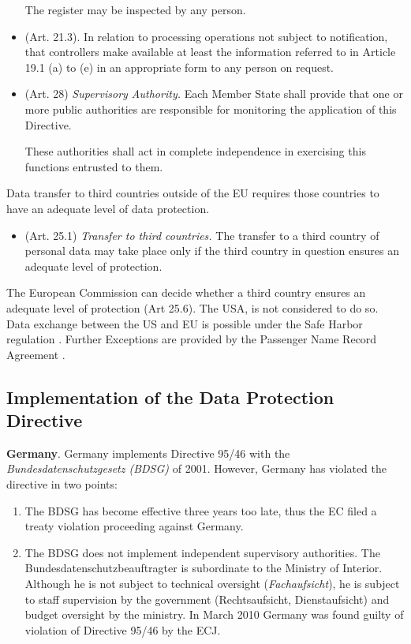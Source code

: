 \begin{itemize}
The register may be inspected by any person.

\item (Art. 21.3). In relation to processing operations not subject to notification, that controllers \om make available at least the information referred to in Article 19.1 (a) to (e) in an appropriate form to any person on request.

\item (Art. 28) \emph{Supervisory Authority.}
Each Member State shall provide that one or more public authorities are responsible for monitoring the application \om of this Directive.

These authorities shall act in complete independence in exercising this functions entrusted to them.
\end{itemize}

Data transfer to third countries outside of the EU requires those countries to have an adequate level of data protection.
\begin{itemize}
\item (Art. 25.1) \emph{Transfer to third countries.}
The transfer to a third country of personal data \om may take place only if \om the third country in question ensures an adequate level of protection.
\end{itemize}
The European Commission can decide whether a third country ensures an adequate level of protection (Art 25.6).
The USA, is not considered to do so.
Data exchange between the US and EU is possible under the Safe Harbor regulation \cite{SAFE_HABOR}.
Further Exceptions are provided by the Passenger Name Record Agreement \cite{PNR}.

\subsection{Implementation of the Data Protection Directive}\label{sec:ECIMPL}

\textbf{Germany}.
Germany implements Directive 95/46 with the \emph{Bundesdatenschutzgesetz (BDSG)}
of 2001. However, Germany has violated the directive in two points:
\begin{enumerate}
\item The BDSG has become effective three years too late, thus the EC filed a treaty violation proceeding against Germany.
\item The BDSG does not implement independent supervisory authorities.
The Bundesdatenschutzbeauftragter is subordinate to the Ministry of Interior.
Although he is not subject to technical oversight (\emph{Fachaufsicht}), he is subject to staff supervision by the government (Rechtsaufsicht, Dienstaufsicht) and budget oversight by the ministry.
In March 2010 Germany was found guilty of violation of Directive 95/46 by the ECJ.
\end{enumerate}

